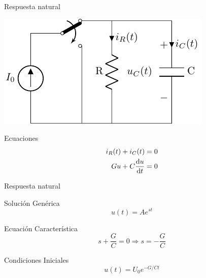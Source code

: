 \documentclass[aspectratio=169, usenames,svgnames,dvipsnames]{beamer}
\begin{document}
\begin{frame}[label={sec:orgac2e950}]{Respuesta natural}
\begin{center}
\includegraphics[height=0.5\textheight]{../figs/transitorio_circuitoRC.pdf}
\end{center}

\begin{block}{Ecuaciones}
\begin{align*}
  i_R(t) + i_C(t) &= 0\\
  G u + C\diff{u}{t} &= 0
\end{align*}
\end{block}
\end{frame}

\begin{frame}[label={sec:org101e7a2}]{Respuesta natural}
\begin{block}{Solución Genérica}
\[
  u(t) = A e^{st}
\]
\end{block}

\begin{block}{Ecuación Característica}
\[
  s + \frac{G}{C} = 0 \Rightarrow s = -\frac{G}{C}
\]
\end{block}

\begin{block}{Condiciones Iniciales}
\[
  u(t) = U_0 e^{-G/C t}
\]
\end{block}
\end{frame}
\end{document}
